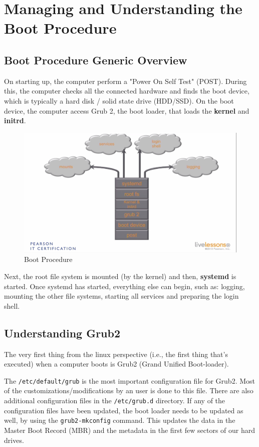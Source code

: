 \chapter{Managing and Understanding the Boot Procedure}
\section{Boot Procedure Generic Overview}
On starting up, the computer perform a "Power On Self Test" (POST). During this, the computer checks all the connected hardware and finds the boot device, which is typically a hard disk / solid state drive (HDD/SSD). On the boot device, the computer access Grub 2, the boot loader, that loads the \textbf{kernel} and \textbf{initrd}. 

\begin{figure}[H]
	\centering
	\includegraphics[width=0.9\linewidth]{Mod3/chapters/3.19.a}
	\caption{Boot Procedure}
	\label{fig:3 Boot Procedure}
\end{figure}

Next, the root file system is mounted (by the kernel) and then, \textbf{systemd} is started. Once systemd has started, everything else can begin, such as: logging, mounting the other file systems, starting all services and preparing the login shell. 

\section{Understanding Grub2}
The very first thing from the linux perspective (i.e., the first thing that's executed) when a computer boots is Grub2 (Grand Unified Boot-loader). 

The \verb|/etc/default/grub| is the most important configuration file for Grub2. Most of the customizations/modifications by an user is done to this file. There are also additional configuration files in the \verb|/etc/grub.d| directory. If any of the configuration files have been updated, the boot loader needs to be updated as well, by using the \verb|grub2-mkconfig| command. This updates the data in the Master Boot Record (MBR) and the metadata in the first few sectors of our hard drives. 

